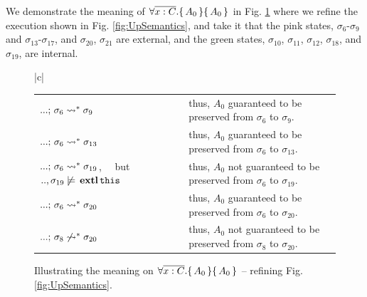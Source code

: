 {{We demonstrate the meaning of ${\forall {\overline {x:C}}.\{\, A_0 \,\}\{\, A_0 \,\}}$ in Fig. \ref{fig:illusrPreserve} where we refine the execution shown in Fig. \ref{fig:UpSemantics}, and take it that the pink states, \ie   ${\sigma_6}$-${\sigma_9}$ and $\sigma_{13}$-$\sigma_{17}$, and  $\sigma_{20}$, $\sigma_{21}$ are external, and the green states, \ie   ${\sigma_{10}}$,  ${\sigma_{11}}$,   ${\sigma_{12}}$,  ${\sigma_{18}}$, and  ${\sigma_{19}}$, are internal. 
 
 \begin{figure}[htb]
\begin{tabular}{|c|}
\hline  %
\\
\hline
\begin{tabular}{lcl}
$...;\, {\sigma_6} \rightsquigarrow^* \sigma_9 $ & & thus, $A_0$ guaranteed to be preserved from $\sigma_6$ to $\sigma_9$.\\
$...;\, {\sigma_6} \rightsquigarrow^* \sigma_{13} $ & & thus, $A_0$ guaranteed to be preserved from $\sigma_6$ to $\sigma_{13}$.\\
$...;\, {\sigma_6} \rightsquigarrow^* \sigma_{19} $, \ \  but $..,\sigma_{19}\not \models {{\ensuremath{\, \mathbf{extl}}\, \mbox{\texttt{this}}\, }}$ & & thus, $A_0$ not guaranteed to be preserved from $\sigma_6$ to $\sigma_{19}$.\\
$...;\, {\sigma_6} \rightsquigarrow^* \sigma_{20} $  \ \   & & thus, $A_0$  guaranteed to be preserved from $\sigma_6$ to $\sigma_{20}$.\\
$...;\, {\sigma_8} \not\rightsquigarrow^* \sigma_{20} $  \ \   & & thus, $A_0$  not guaranteed to be preserved from $\sigma_8$ to $\sigma_{20}$.\\
\hline
\end{tabular}
\end{tabular}
   \caption{Illustrating  the meaning on ${\forall {\overline {x:C}}.\{\, A_0 \,\}\{\, A_0 \,\}}$  -- refining Fig. \ref{fig:UpSemantics}.  }
   \label{fig:illusrPreserve} 
 \end{figure}
 
}}
